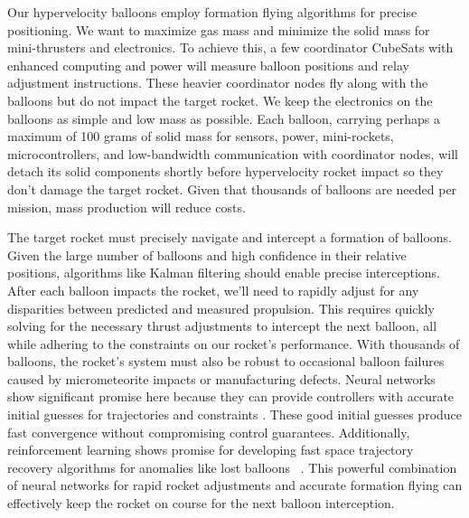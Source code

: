 \documentclass{article}
\begin{document}
Our hypervelocity balloons employ formation flying algorithms for precise positioning. We want to maximize gas mass and minimize the solid mass for mini-thrusters and electronics. To achieve this, a few coordinator CubeSats with enhanced computing and power will measure balloon positions and relay adjustment instructions.  These heavier coordinator nodes fly along with the balloons but do not impact the target rocket.  We keep the electronics on the balloons as simple and low mass as possible.   Each balloon, carrying perhaps a maximum of 100 grams of solid mass for sensors, power, mini-rockets, microcontrollers, and low-bandwidth communication with coordinator nodes, will detach its solid components shortly before hypervelocity rocket impact so they don't damage the target rocket. Given that thousands of balloons are needed per mission, mass production will reduce costs.  

The target rocket must precisely navigate and intercept a formation of balloons. Given the large number of balloons and high confidence in their relative positions, algorithms like Kalman filtering should enable precise interceptions. After each balloon impacts the rocket, we'll need to rapidly adjust for any disparities between predicted and measured propulsion. This requires quickly solving for the necessary thrust adjustments to intercept the next balloon, all while adhering to the constraints on our rocket's performance. With thousands of balloons, the rocket's system must also be robust to occasional balloon failures caused by micrometeorite impacts or manufacturing defects. Neural networks show significant promise here because they can provide controllers with accurate initial guesses for trajectories \cite{guffanti2024transformerstrajectoryoptimizationapplication} and constraints \cite{briden_constraint}.   These good initial guesses produce fast convergence without compromising control guarantees.   Additionally, reinforcement learning shows promise for developing fast space trajectory recovery algorithms for anomalies like lost balloons \ \cite{zavoli2021reinforcement}.   This powerful combination of neural networks for rapid rocket adjustments and accurate formation flying can effectively keep the rocket on course for the next balloon interception.
\end{document}
